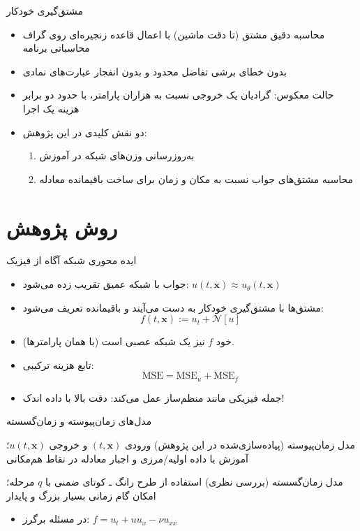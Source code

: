 \documentclass[12pt,aspectratio=169]{beamer}
\begin{document}
\begin{frame}{مشتق‌گیری خودکار}
\begin{itemize}
\item محاسبه دقیق مشتق (تا دقت ماشین) با اعمال قاعده زنجیره‌ای روی گراف محاسباتی برنامه
\item بدون خطای برشی تفاضل محدود و بدون انفجار عبارت‌های نمادی
\item حالت معکوس: گرادیان یک خروجی نسبت به هزاران پارامتر، با حدود دو برابر هزینه یک اجرا
\item دو نقش کلیدی در این پژوهش:
\begin{enumerate}
\item به‌روزرسانی وزن‌های شبکه در آموزش
\item محاسبه مشتق‌های جواب نسبت به مکان و زمان برای ساخت باقیمانده معادله
\end{enumerate}
\end{itemize}
\end{frame}

\section{روش پژوهش}

\begin{frame}{ایده محوری شبکه آگاه از فیزیک}
\begin{itemize}
\item جواب با شبکه عمیق تقریب زده می‌شود: $u(t,\mathbf{x}) \approx u_\theta(t,\mathbf{x})$
\item مشتق‌ها با مشتق‌گیری خودکار به دست می‌آیند و باقیمانده تعریف می‌شود:
\begin{equation*}
f(t,\mathbf{x}) := u_t + \mathcal{N}[u]
\end{equation*}
\item خود $f$ نیز یک شبکه عصبی است (با همان پارامترها).
\item تابع هزینه ترکیبی:
\begin{equation*}
\mathrm{MSE} = \mathrm{MSE}_u + \mathrm{MSE}_f
\end{equation*}
\item جمله فیزیکی مانند منظم‌ساز عمل می‌کند: دقت بالا با داده اندک!
\end{itemize}
\end{frame}

\begin{frame}{مدل‌های زمان‌پیوسته و زمان‌گسسته}
\begin{block}{مدل زمان‌پیوسته (پیاده‌سازی‌شده در این پژوهش)}
ورودی $(t,\mathbf{x})$ و خروجی $u(t,\mathbf{x})$؛ آموزش با داده اولیه/مرزی و اجبار معادله در نقاط هم‌مکانی
\end{block}
\vspace{2mm}
\begin{block}{مدل زمان‌گسسته (بررسی نظری)}
استفاده از طرح رانگ ـ کوتای ضمنی با $q$ مرحله؛ امکان گام زمانی بسیار بزرگ و پایدار
\end{block}
\vspace{2mm}
\begin{itemize}
\item در مسئله برگرز: $f = u_t + u u_x - \nu u_{xx}$
\end{itemize}
\end{frame}
\end{document}
